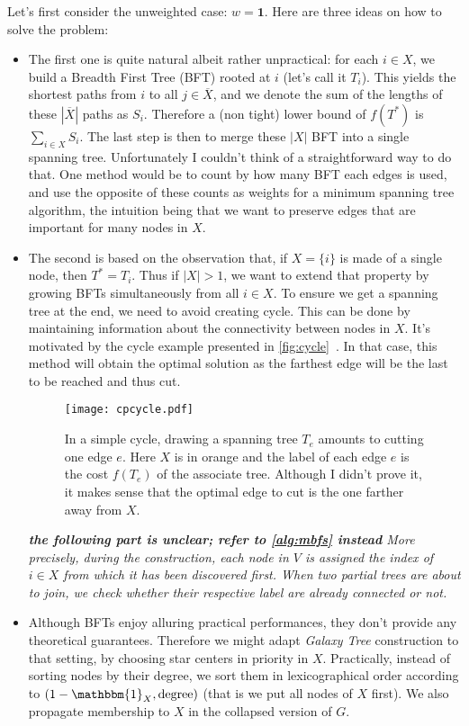\documentclass[a4paper,final,notitlepage,11pt,svgnames]{scrartcl}
\newcommand{\stcomp}[1]{\ensuremath{\overline{#1}}}
\begin{document}
Let's first consider the unweighted case: $w=\boldsymbol{1}$. Here are three
ideas on how to solve the problem:
\begin{itemize}

	\item The first one is quite natural albeit rather unpractical: for each $i
		\in X$, we build a Breadth First Tree (BFT) rooted at $i$ (let's call
		it $T_i$). This yields the shortest paths from $i$ to all $j \in
		\stcomp{X}$, and we denote the sum of the lengths of these
		$|\stcomp{X}|$ paths as $S_i$.  Therefore a (non tight) lower bound of
		$f(T^*)$ is $\sum_{i\in X} S_i$.  The last step is then to merge these
		$|X|$ BFT into a single spanning tree. Unfortunately I couldn't think
		of a straightforward way to do that. One method would be to count by
		how many BFT each edges is used, and use the opposite of these counts
		as weights for a minimum spanning tree algorithm, the intuition being
		that we want to preserve edges that are important for many nodes in
		$X$.

	\item The second is based on the observation that, if $X = \{i\}$ is made of
		a single node, then $T^* = T_i$. Thus if $|X| > 1$, we want to
		extend that property by growing BFTs simultaneously from all $i \in X$.
		To ensure we get a spanning tree at the end, we need to avoid creating
		cycle. This can be done by maintaining information about the
		connectivity between nodes in $X$. It's motivated by the cycle example
		presented in \autoref{fig:cycle}~. In that case,
		this method will obtain the optimal solution as the farthest edge will
		be the last to be reached and thus cut.

		\begin{figure}[hbp]
			\centering
			\texttt{[image: cpcycle.pdf]}
			\caption{In a simple cycle, drawing a spanning tree $T_e$ amounts
				to cutting one edge $e$. Here $X$ is in orange and the label of
				each edge $e$ is the cost $f(T_e)$ of the associate tree.
				Although I didn't prove it, it makes sense that the
				optimal edge to cut is the one farther away from $X$. \label{fig:cycle}}
		\end{figure}

		\emph{\textbf{the following part is unclear; refer to
		\autoref{alg:mbfs}  instead} More precisely, during the
		construction, each node in $V$ is assigned the index of $i \in X$ from
		which it has been discovered first. When two partial trees are about to
		join, we check whether their respective label are already connected or not.}

	\item Although BFTs enjoy alluring practical performances, they don't
		provide any theoretical guarantees. Therefore we might adapt
		\emph{Galaxy Tree} construction to that setting, by choosing star
		centers in priority in $X$. Practically, instead of sorting nodes by
		their degree, we sort them in lexicographical order according to $(1 -
		\mathbbm{1}_X, \textrm{degree})$ (that is we put all nodes of $X$
		first). We also propagate membership to $X$ in the collapsed version of
		$G$.

\end{itemize}
\end{document}
